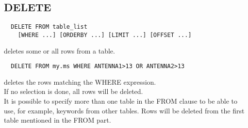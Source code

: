 \subsection{DELETE}
\begin{verbatim}
  DELETE FROM table_list
    [WHERE ...] [ORDERBY ...] [LIMIT ...] [OFFSET ...]
\end{verbatim}
deletes some or all rows from a table.
\begin{verbatim}
  DELETE FROM my.ms WHERE ANTENNA1>13 OR ANTENNA2>13
\end{verbatim}
deletes the rows matching the WHERE expression.
\\If no selection is done, all rows will be deleted.
\\It is possible to specify more than one table in the FROM clause to
be able to use, for example, keywords from other tables.
Rows will be deleted from the first table mentioned in the FROM part.


